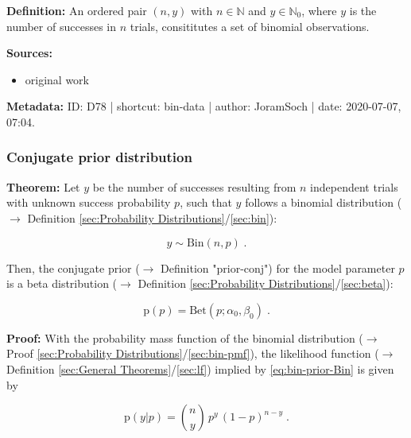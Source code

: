 \documentclass[a4paper,12pt,twoside]{book}
\begin{document}
\textbf{Definition:} An ordered pair $(n,y)$ with $n \in \mathbb{N}$ and $y \in \mathbb{N}_0$, where $y$ is the number of successes in $n$ trials, consititutes a set of binomial observations.


\vspace{1em}
\textbf{Sources:}
\begin{itemize}
\item original work\end{itemize}


\vspace{1em}
\textbf{Metadata:} ID: D78 | shortcut: bin-data | author: JoramSoch | date: 2020-07-07, 07:04.
\vspace{1em}



\subsubsection[\textbf{Conjugate prior distribution}]{Conjugate prior distribution} \label{sec:bin-prior}
\setcounter{equation}{0}

\textbf{Theorem:} Let $y$ be the number of successes resulting from $n$ independent trials with unknown success probability $p$, such that $y$ follows a binomial distribution ($\rightarrow$ Definition \ref{sec:Probability Distributions}/\ref{sec:bin}):

\begin{equation} \label{eq:bin-prior-Bin}
y \sim \mathrm{Bin}(n,p) \; .
\end{equation}

Then, the conjugate prior ($\rightarrow$ Definition "prior-conj") for the model parameter $p$ is a beta distribution ($\rightarrow$ Definition \ref{sec:Probability Distributions}/\ref{sec:beta}):

\begin{equation} \label{eq:bin-prior-Beta}
\mathrm{p}(p) = \mathrm{Bet}(p; \alpha_0, \beta_0) \; .
\end{equation}


\vspace{1em}
\textbf{Proof:} With the probability mass function of the binomial distribution ($\rightarrow$ Proof \ref{sec:Probability Distributions}/\ref{sec:bin-pmf}), the likelihood function ($\rightarrow$ Definition \ref{sec:General Theorems}/\ref{sec:lf}) implied by \eqref{eq:bin-prior-Bin} is given by

\begin{equation} \label{eq:bin-prior-Bin-LF}
\mathrm{p}(y|p) = {n \choose y} \, p^y \, (1-p)^{n-y} \; .
\end{equation}
\end{document}
